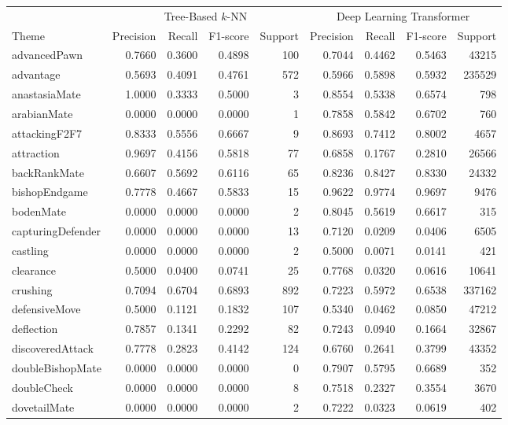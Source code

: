 \begin{table}[H]
  \centering
  \begin{adjustbox}{width=\textwidth}
    \begin{tabular}{l|rrrr|rrrr}
      & \multicolumn{4}{c}{Tree-Based $k$-NN} & \multicolumn{4}{c}{Deep Learning Transformer} \\
      Theme & Precision & Recall & F1-score & Support & Precision & Recall & F1-score & Support \\
      \hline

      advancedPawn&0.7660&0.3600&0.4898&100&0.7044&0.4462&0.5463&43215\\
      advantage&0.5693&0.4091&0.4761&572&0.5966&0.5898&0.5932&235529\\
      anastasiaMate&1.0000&0.3333&0.5000&3&0.8554&0.5338&0.6574&798\\
      arabianMate&0.0000&0.0000&0.0000&1&0.7858&0.5842&0.6702&760\\
      attackingF2F7&0.8333&0.5556&0.6667&9&0.8693&0.7412&0.8002&4657\\
      attraction&0.9697&0.4156&0.5818&77&0.6858&0.1767&0.2810&26566\\
      backRankMate&0.6607&0.5692&0.6116&65&0.8236&0.8427&0.8330&24332\\
      \rowcolor{lightgray} bishopEndgame&0.7778&0.4667&0.5833&15&0.9622&0.9774&0.9697&9476\\
      bodenMate&0.0000&0.0000&0.0000&2&0.8045&0.5619&0.6617&315\\
      capturingDefender&0.0000&0.0000&0.0000&13&0.7120&0.0209&0.0406&6505\\
      castling&0.0000&0.0000&0.0000&2&0.5000&0.0071&0.0141&421\\
      clearance&0.5000&0.0400&0.0741&25&0.7768&0.0320&0.0616&10641\\
      crushing&0.7094&0.6704&0.6893&892&0.7223&0.5972&0.6538&337162\\
      defensiveMove&0.5000&0.1121&0.1832&107&0.5340&0.0462&0.0850&47212\\
      deflection&0.7857&0.1341&0.2292&82&0.7243&0.0940&0.1664&32867\\
      discoveredAttack&0.7778&0.2823&0.4142&124&0.6760&0.2641&0.3799&43352\\
      doubleBishopMate&0.0000&0.0000&0.0000&0&0.7907&0.5795&0.6689&352\\
      doubleCheck&0.0000&0.0000&0.0000&8&0.7518&0.2327&0.3554&3670\\
      dovetailMate&0.0000&0.0000&0.0000&2&0.7222&0.0323&0.0619&402\\

\end{tabular}
\end{adjustbox}
\end{table}
